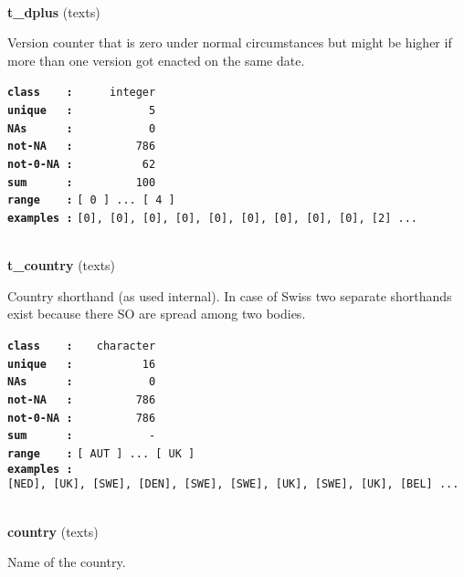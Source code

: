 \documentclass[]{article}
\begin{document}
~

\textbf{t\_dplus} (texts)

Version counter that is zero under normal circumstances but might be
higher if more than one version got enacted on the same date.

\textbf{\texttt{class\ \ \ \ :}} \texttt{~~~~~integer}\\
\textbf{\texttt{unique\ \ \ :}} \texttt{~~~~~~~~~~~5}\\
\textbf{\texttt{NAs\ \ \ \ \ \ :}} \texttt{~~~~~~~~~~~0}\\
\textbf{\texttt{not-NA\ \ \ :}} \texttt{~~~~~~~~~786}\\
\textbf{\texttt{not-0-NA\ :}} \texttt{~~~~~~~~~~62}\\
\textbf{\texttt{sum\ \ \ \ \ \ :}} \texttt{~~~~~~~~~100}\\
\textbf{\texttt{range\ \ \ \ :}}
\texttt{{[}\ 0\ {]}\ ...\ {[}\ 4\ {]}}\\
\textbf{\texttt{examples\ :}}
\texttt{{[}0{]},\ {[}0{]},\ {[}0{]},\ {[}0{]},\ {[}0{]},\ {[}0{]},\ {[}0{]},\ {[}0{]},\ {[}0{]},\ {[}2{]}\ ...}\\

~

\textbf{t\_country} (texts)

Country shorthand (as used internal). In case of Swiss two separate
shorthands exist because there SO are spread among two bodies.

\textbf{\texttt{class\ \ \ \ :}} \texttt{~~~character}\\
\textbf{\texttt{unique\ \ \ :}} \texttt{~~~~~~~~~~16}\\
\textbf{\texttt{NAs\ \ \ \ \ \ :}} \texttt{~~~~~~~~~~~0}\\
\textbf{\texttt{not-NA\ \ \ :}} \texttt{~~~~~~~~~786}\\
\textbf{\texttt{not-0-NA\ :}} \texttt{~~~~~~~~~786}\\
\textbf{\texttt{sum\ \ \ \ \ \ :}} \texttt{~~~~~~~~~~~-}\\
\textbf{\texttt{range\ \ \ \ :}}
\texttt{{[}\ AUT\ {]}\ ...\ {[}\ UK\ {]}}\\
\textbf{\texttt{examples\ :}}
\texttt{{[}NED{]},\ {[}UK{]},\ {[}SWE{]},\ {[}DEN{]},\ {[}SWE{]},\ {[}SWE{]},\ {[}UK{]},\ {[}SWE{]},\ {[}UK{]},\ {[}BEL{]}\ ...}\\

~

\textbf{country} (texts)

Name of the country.
\end{document}

